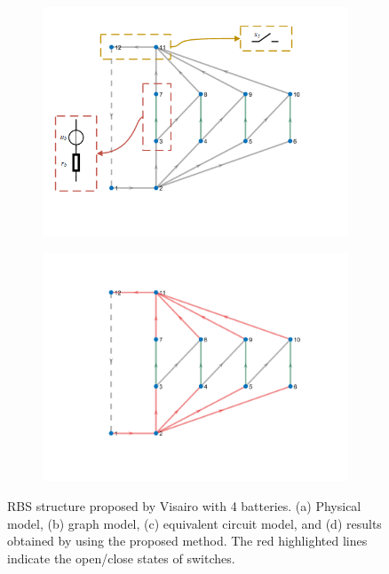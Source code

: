 \documentclass{article}
\begin{document}
\begin{figure}[htbp]
\begin{subfigure}[b]{0.45\textwidth}
    \includegraphics[width=\textwidth]{../attachments/f-dege-4-modify.png}
    \caption{}
    \label{fig:f4-circ}
  \end{subfigure}
  \hspace{0.05\textwidth}
  \begin{subfigure}[b]{0.45\textwidth}
    \includegraphics[width=\textwidth]{../attachments/f-dege-mac-4.png}
    \caption{}
    \label{fig:f4-mac}
  \end{subfigure}
  \caption{ RBS structure proposed by Visairo\cite{visairoReconfigurableBatteryPack2008} with 4 batteries. (a) Physical model, (b) graph model, (c) equivalent circuit model, and (d) results obtained by using the proposed method. The red highlighted lines indicate the open/close states of switches.}
  \label{fig:f4-all}
\end{figure}
\end{document}
